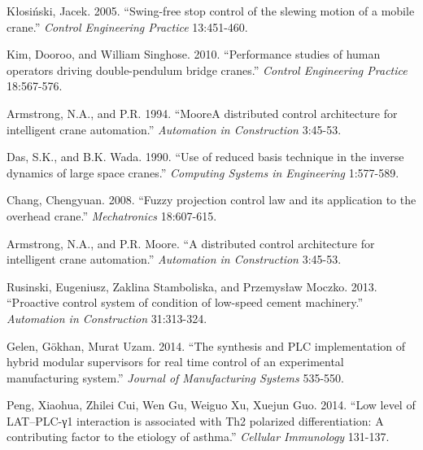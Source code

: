 \documentclass[a4paper]{article}
\begin{document}
\setlength{\hangindent}{4em}
Kłosiński, Jacek. 2005. ``Swing-free stop control of the slewing motion of a mobile crane.''
\textit{Control Engineering Practice} 13:451-460. \par

\setlength{\hangindent}{4em}
Kim, Dooroo, and William Singhose. 2010. ``Performance studies of human operators driving double-pendulum bridge cranes.''
\textit{Control Engineering Practice} 18:567-576. \par

\setlength{\hangindent}{4em}
Armstrong, N.A., and P.R. 1994. ``MooreA distributed control architecture for intelligent crane automation.''
\textit{Automation in Construction} 3:45-53. \par

\setlength{\hangindent}{4em}
Das, S.K., and B.K. Wada. 1990. ``Use of reduced basis technique in the inverse dynamics of large space cranes.''
\textit{Computing Systems in Engineering} 1:577-589. \par

\setlength{\hangindent}{4em}
Chang, Chengyuan. 2008. ``Fuzzy projection control law and its application to the overhead crane.''
\textit{Mechatronics} 18:607-615. \par

\setlength{\hangindent}{4em}
Armstrong, N.A., and P.R. Moore. ``A distributed control architecture for intelligent crane automation.''
\textit{Automation in Construction} 3:45-53. \par

\setlength{\hangindent}{4em}
Rusinski, Eugeniusz, Zaklina Stamboliska, and Przemysław Moczko. 2013. ``Proactive control system of condition of low-speed cement machinery.''
\textit{Automation in Construction} 31:313-324. \par

\setlength{\hangindent}{4em}
Gelen, Gökhan, Murat Uzam. 2014. ``The synthesis and PLC implementation of hybrid modular supervisors for real time control of an experimental manufacturing system.''
\textit{Journal of Manufacturing Systems} 535-550. \par

\setlength{\hangindent}{4em}
Peng, Xiaohua, Zhilei Cui, Wen Gu, Weiguo Xu, Xuejun Guo. 2014. ``Low level of LAT–PLC-γ1 interaction is associated with Th2 polarized differentiation: A contributing factor to the etiology of asthma.''
\textit{Cellular Immunology} 131-137. \par
\end{document}
